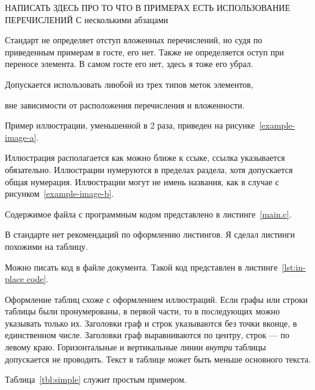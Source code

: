 НАПИСАТЬ ЗДЕСЬ ПРО ТО ЧТО В ПРИМЕРАХ ЕСТЬ ИСПОЛЬЗОВАНИЕ ПЕРЕЧИСЛЕНИЙ С несколькими абзацами

Стандарт не определяет отступ вложенных перечислений, но судя по приведенным примерам в госте,
его нет. Также не определяется оступ при переносе элемента. В самом госте его нет, здесь я тоже
его убрал.

\begin{asblist}
    \item Допускается использовать лиюбой из трех типов меток элементов,
    \item вне зависимости от расположения перечисления и вложенности.
\end{asblist}
  

Пример иллюстрации, уменьшенной в 2 раза, приведен на рисунке~\ref{example-image-a}.


Иллюстрация располагается как можно ближе к ссыке, ссылка указывается обязательно.
Иллюстрации нумеруются в пределах раздела, хотя допускается общая нумерация.
Иллюстрации могут не имень названия, как в случае с рисунком~\ref{example-image-b}.


Содержимое файла с программным кодом представлено в листинге~\ref{main.c}.


В стандарте нет рекомендаций по оформлению листингов. Я сделал листинги похожими на таблицу.

Можно писать код в файле документа. Такой код представлен в листинге~\ref{lst:in-place code}.

Оформление таблиц схоже с оформлением иллюстраций.
Если графы или строки таблицы были пронумерованы,
в первой части, то в последующих можно указывать только их. Заголовки граф и строк указываются
без точки вконце, в единственном числе. Заголовки граф выравниваются по центру, строк --- по
левому краю. Горизонтальные и вертикальные линии \emph{внутри} таблицы допускается не проводить.
Текст в таблице может быть меньше основного текста.

Таблица~\ref{tbl:simple} служит простым примером.


